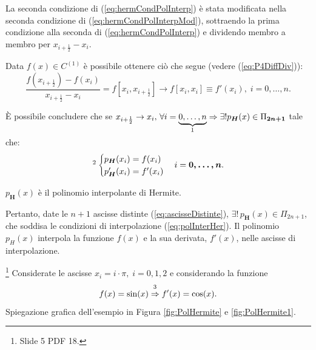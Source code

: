 \begin{remark}
    La seconda condizione di (\ref{eq:hermCondPolInterp}) è stata modificata nella seconda condizione di (\ref{eq:hermCondPolInterpMod}), sottraendo la prima condizione alla seconda di (\ref{eq:hermCondPolInterp}) e dividendo membro a membro per $x_{i+\frac{1}{2}}-x_i$.
\end{remark}

Data $f(x)\in C^{(1)}$ è possibile ottenere ciò che segue (vedere (\ref{eq:P4DiffDiv})):
\begin{equation}\label{eq:equivApproxf'}
    \frac{f\left(x_{i+\frac{1}{2}}\right)-f(x_i)}{x_{i+\frac{1}{2}}-x_i}=f\left[x_i,x_{i+\frac{1}{2}}\right]\rightarrow f[x_i,x_i]\equiv f'(x_i),\; i=0,\hdots,n.
\end{equation}

È possibile concludere che se $x_{i+\frac{1}{2}}\rightarrow x_i,\, \forall i=\underbrace{0,\hdots, n}_{\footnotemark}\Rightarrow\exists! p_{\boldsymbol H}(x)\in\Pi_{\boldsymbol{2n+1}}$ tale che: 
\begin{equation}\label{eq:polInterHer}
    \footnotemark\begin{cases}
        p_{\boldsymbol H}(x_i)=f(x_i)\\
        p_{\boldsymbol H}'(x_i)=f'(x_i)
    \end{cases} i=\boldsymbol{0,\hdots,n}.
\end{equation}

\begin{definition}
    $p_{\boldsymbol H}(x)$ è il polinomio interpolante di Hermite.  
\end{definition}

Pertanto, date le $n+1$ ascisse distinte (\ref{eq:ascisseDistinte}), $\exists!\, p_{\boldsymbol H}(x)\in\Pi_{2n+1}$, che soddisa le condizioni di interpolazione (\ref{eq:polInterHer}). Il polinomio $p_H(x)$ interpola la funzione $f(x)$ e la sua derivata, $f'(x)$, nelle ascisse di interpolazione.

\begin{example}\footnote{Slide 5 PDF 18.}
    Considerate le ascisse $x_i=i\cdot\pi,\; i=0,1,2$ e considerando la funzione
    \begin{equation*}
        f(x)=\sin(x)\overset{\footnotemark}{\Rightarrow}f'(x)=\cos(x).
    \end{equation*}
    Spiegazione grafica dell'esempio in Figura \ref{fig:PolHermite} e \ref{fig:PolHermite1}. 
\end{example}

